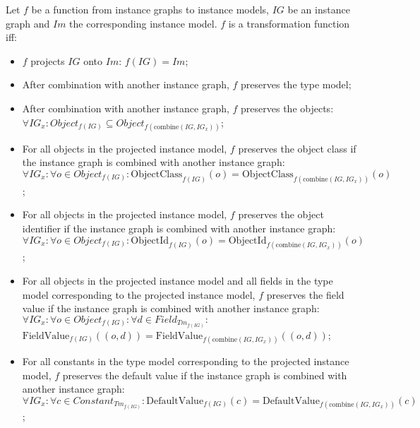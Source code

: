 \begin{defin}
\label{defin:transformation_framework:instance_models_and_instance_graphs:combining_transformation_functions:transformation_function_instance_graph_instance_model}
Let $f$ be a function from instance graphs to instance models, $IG$ be an instance graph and $Im$ the corresponding instance model. $f$ is a transformation function iff:
\begin{itemize}
    \item $f$ projects $IG$ onto $Im$: $f(IG) = Im$;
    \item After combination with another instance graph, $f$ preserves the type model;
    \item After combination with another instance graph, $f$ preserves the objects:\\$\forall IG_x\!: Object_{f(IG)} \subseteq Object_{f(\mathrm{combine}(IG, IG_x))}$;
    \item For all objects in the projected instance model, $f$ preserves the object class if the instance graph is combined with another instance graph:\\$\forall IG_x\!: \forall o \in Object_{f(IG)}\!: \mathrm{ObjectClass}_{f(IG)}(o) = \mathrm{ObjectClass}_{f(\mathrm{combine}(IG, IG_x))}(o)$;
    \item For all objects in the projected instance model, $f$ preserves the object identifier if the instance graph is combined with another instance graph:\\$\forall IG_x\!: \forall o \in Object_{f(IG)}\!: \mathrm{ObjectId}_{f(IG)}(o) = \mathrm{ObjectId}_{f(\mathrm{combine}(IG, IG_x))}(o)$;
    \item For all objects in the projected instance model and all fields in the type model corresponding to the projected instance model, $f$ preserves the field value if the instance graph is combined with another instance graph:\\$\forall IG_x\!: \forall o \in Object_{f(IG)}\!: \forall d \in Field_{Tm_{f(IG)}}\!:$\\$ \mathrm{FieldValue}_{f(IG)}(( o, d )) = \mathrm{FieldValue}_{f(\mathrm{combine}(IG, IG_x))}(( o, d ))$;
    \item For all constants in the type model corresponding to the projected instance model, $f$ preserves the default value if the instance graph is combined with another instance graph:\\$\forall IG_x\!: \forall c \in Constant_{Tm_{f(IG)}}\!: \mathrm{DefaultValue}_{f(IG)}(c) = \mathrm{DefaultValue}_{f(\mathrm{combine}(IG, IG_x))}(c)$;
\end{itemize}
\end{defin}

